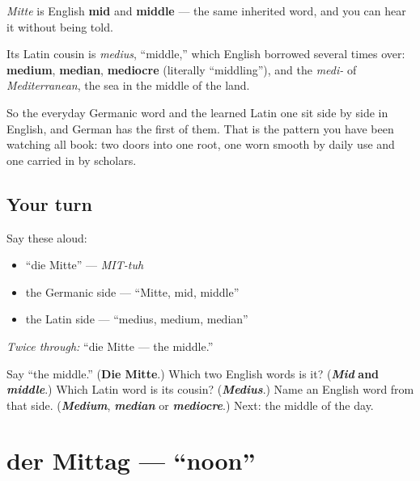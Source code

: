 \begin{cousinweb}
\emph{Mitte} is English \textbf{mid} and \textbf{middle} — the same inherited word, and you can hear it without being told.

Its Latin cousin is \emph{medius}, \textquotedblleft{}middle,\textquotedblright{} which English borrowed several times over: \textbf{medium}, \textbf{median}, \textbf{mediocre} (literally \textquotedblleft{}middling\textquotedblright{}), and the \emph{medi-} of \emph{Mediterranean}, the sea in the middle of the land.

So the everyday Germanic word and the learned Latin one sit side by side in English, and German has the first of them. That is the pattern you have been watching all book: two doors into one root, one worn smooth by daily use and one carried in by scholars.
\end{cousinweb}

\subsection*{Your turn}
Say these aloud:

\begin{itemize}
\raggedright
  \item \textquotedblleft{}die Mitte\textquotedblright{} — \emph{MIT-tuh}
  \item the Germanic side — \textquotedblleft{}Mitte, mid, middle\textquotedblright{}
  \item the Latin side — \textquotedblleft{}medius, medium, median\textquotedblright{}
\end{itemize}

\emph{Twice through:} \textquotedblleft{}die Mitte — the middle.\textquotedblright{}

\begin{tcolorbox}[breakable,colback=teal!4,colframe=teal!35!black,title={Before you move on}]
Say \textquotedblleft{}the middle.\textquotedblright{} (\textbf{Die Mitte}.) Which two English words is it? (\emph{\textbf{Mid}} \textbf{and} \emph{\textbf{middle}}.) Which Latin word is its cousin? (\emph{\textbf{Medius}}.) Name an English word from that side. (\emph{\textbf{Medium}}, \emph{\textbf{median}} or \emph{\textbf{mediocre}}.) Next: the middle of the day.
\end{tcolorbox}
\section[der Mittag]{der Mittag — \textquotedblleft{}noon\textquotedblright{}}

